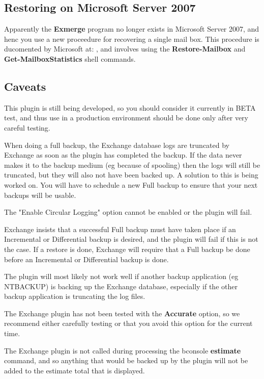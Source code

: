 \subsection{Restoring on Microsoft Server 2007}
Apparently the {\bf Exmerge} program no longer exists in Microsoft Server
2007, and henc you use a new proceedure for recovering a single mail box.
This procedure is ducomented by Microsoft at:
,
and involves using the {\bf Restore-Mailbox} and {\bf
Get-MailboxStatistics} shell commands.

\subsection{Caveats}
This plugin is still being developed, so you should consider it
currently in BETA test, and thus use in a production environment
should be done only after very careful testing.

When doing a full backup, the Exchange database logs are truncated by
Exchange as soon as the plugin has completed the backup. If the data
never makes it to the backup medium (eg because of spooling) then the
logs will still be truncated, but they will also not have been backed
up. A solution to this is being worked on. You will have to schedule a
new Full backup to ensure that your next backups will be usable.

The "Enable Circular Logging" option cannot be enabled or the plugin
will fail.

Exchange insists that a successful Full backup must have taken place if
an Incremental or Differential backup is desired, and the plugin will
fail if this is not the case. If a restore is done, Exchange will
require that a Full backup be done before an Incremental or Differential
backup is done.

The plugin will most likely not work well if another backup application
(eg NTBACKUP) is backing up the Exchange database, especially if the
other backup application is truncating the log files.

The Exchange plugin has not been tested with the {\bf Accurate} option, so
we recommend either carefully testing or that you avoid this option for
the current time.

The Exchange plugin is not called during processing the bconsole {\bf
estimate} command, and so anything that would be backed up by the plugin
will not be added to the estimate total that is displayed.


